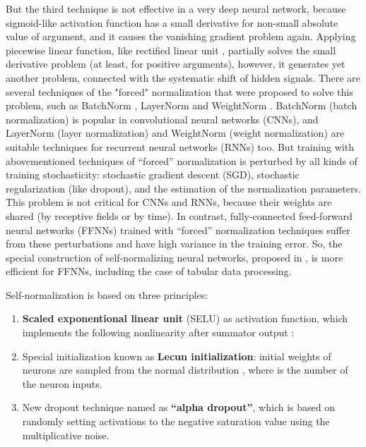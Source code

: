 \documentclass{article}
\begin{document}
But the third technique is not effective in a very deep neural network, because sigmoid-like activation function has a small derivative for non-small absolute value of argument, and it causes the vanishing gradient problem again. Applying piecewise linear function, like rectified linear unit \cite{glorot2011relu}, partially solves the small derivative problem (at least, for positive arguments), however, it generates yet another problem, connected with the systematic shift of hidden signals. There are several techniques of the "forced" normalization that were proposed to solve this problem, such as BatchNorm \cite{ioffe2015batchnorm}, LayerNorm \cite{Ba2016LayerN} and WeightNorm \cite{Salimans2016WeightNA}. BatchNorm (batch normalization) is popular in convolutional neural networks (CNNs), and LayerNorm (layer normalization) and WeightNorm (weight normalization) are suitable techniques for recurrent neural networks (RNNs) too. But training with abovementioned techniques of “forced” normalization is perturbed by all kinds of training stochasticity: stochastic gradient descent (SGD), stochastic regularization (like dropout), and the estimation of the normalization parameters. This problem is not critical for CNNs and RNNs, because their weights are shared (by receptive fields or by time). In contrast, fully-connected feed-forward neural networks (FFNNs) trained with “forced” normalization techniques suffer from these perturbations and have high variance in the training error. So, the special construction of self-normalizing neural networks, proposed in \cite{Klambauer2017}, is more efficient for FFNNs, including the case of tabular data processing.

Self-normalization is based on three principles:

\begin{enumerate}
    \item \textbf{Scaled exponentional linear unit} (SELU) as activation function, which implements the following nonlinearity after summator output :



    \item Special initialization known as \textbf{Lecun initialization}: initial weights of neurons are sampled from the normal distribution , where  is the number of the neuron inputs.
    \item New dropout technique named as \textbf{“alpha dropout”}, which is based on randomly setting activations to the negative saturation value using the multiplicative noise.
\end{enumerate}
\end{document}
